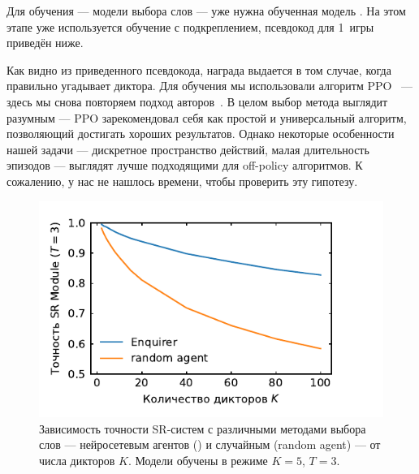 Для обучения \enquirer{} --- модели выбора слов --- уже нужна обученная модель
\guesser{}. На этом этапе уже используется обучение с подкреплением, псевдокод
для 1~игры приведён ниже.


Как видно из приведенного псевдокода, награда выдается в том случае, когда
\guesser{} правильно угадывает диктора. Для обучения мы использовали алгоритм
PPO~\cite{schulman2017proximal} --- здесь мы снова повторяем подход
авторов~\citeisr{}. В целом выбор метода выглядит разумным --- PPO
зарекомендовал себя как простой и универсальный алгоритм, позволяющий достигать
хороших результатов. Однако некоторые особенности нашей задачи --- дискретное
пространство действий, малая длительность эпизодов --- выглядят лучше подходящими
для off-policy алгоритмов. К сожалению, у нас не нашлось времени, чтобы проверить
эту гипотезу.

\begin{figure}[!h]
    \centering
    \includegraphics[scale=1.0]{../plots/guest_sweep_enq.pdf}
    \caption{Зависимость точности SR-систем с различными методами выбора слов
    --- нейросетевым агентов (\enquirer{}) и случайным (random agent) --- от
    числа дикторов $K$. Модели обучены в режиме $K = 5$, $T = 3$.}
\end{figure}

